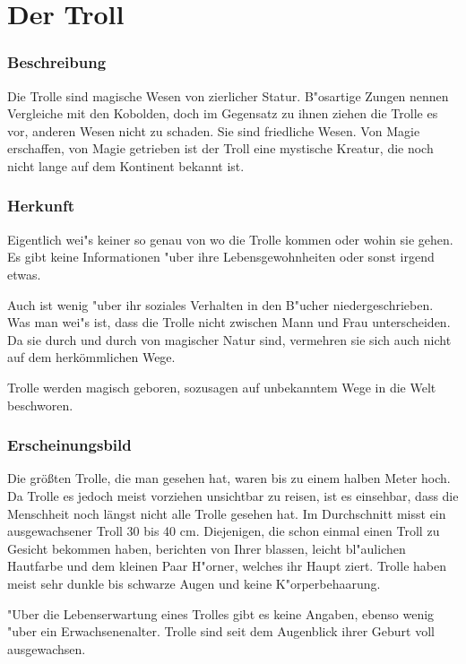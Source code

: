 \section{Der Troll}
\subsubsection{Beschreibung}
\par Die Trolle sind magische Wesen von zierlicher Statur.
B"osartige Zungen nennen Vergleiche mit den Kobolden, doch im Gegensatz zu ihnen ziehen die Trolle es vor, anderen
Wesen nicht zu schaden. Sie sind friedliche Wesen. Von Magie
erschaffen, von Magie getrieben ist der Troll eine mystische
Kreatur, die noch nicht lange auf dem Kontinent bekannt ist.
\subsubsection{Herkunft}
\par Eigentlich wei"s keiner so genau von wo die Trolle
kommen oder wohin sie gehen. Es gibt keine Informationen "uber ihre
Lebensgewohnheiten oder sonst irgend etwas.
\par Auch ist wenig "uber ihr soziales Verhalten in den
B"ucher niedergeschrieben. Was man wei"s ist, dass die Trolle nicht
zwischen Mann und Frau unterscheiden. Da sie durch und durch von
magischer Natur sind, vermehren sie sich auch nicht auf dem
herkömmlichen Wege.
\par Trolle werden magisch geboren, sozusagen auf unbekanntem Wege
in die Welt beschworen.
\subsubsection{Erscheinungsbild}
\par Die größten Trolle, die man gesehen hat, waren
bis zu einem halben Meter hoch. Da Trolle es jedoch meist vorziehen
unsichtbar zu reisen, ist es einsehbar, dass die Menschheit noch
längst nicht alle Trolle gesehen hat. Im Durchschnitt misst ein
ausgewachsener Troll 30 bis 40 cm. Diejenigen, die schon einmal
einen Troll zu Gesicht bekommen haben, berichten von Ihrer blassen,
leicht bl"aulichen Hautfarbe und dem kleinen Paar H"orner, welches
ihr Haupt ziert. Trolle haben meist sehr dunkle bis schwarze Augen
und keine K"orperbehaarung.
\par "Uber die Lebenserwartung eines Trolles gibt es keine
Angaben, ebenso wenig "uber ein Erwachsenenalter. Trolle sind seit
dem Augenblick ihrer \glqq Geburt\grqq{} voll ausgewachsen.
